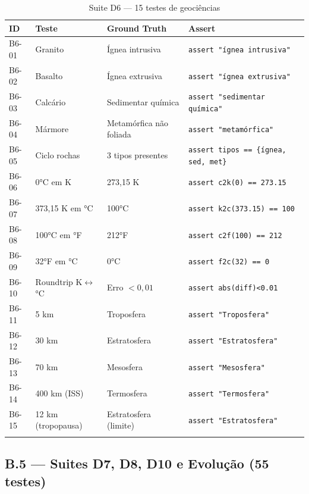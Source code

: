 \documentclass[12pt,a4paper,oneside]{article}
\begin{document}
\begin{longtable}{p{}p{}p{}p{}}
\toprule
\textbf{ID} & \textbf{Teste} & \textbf{Ground Truth} & \textbf{Assert} \\
\midrule
B6-01 & Granito & Ígnea intrusiva & \texttt{assert "ígnea intrusiva"} \\
B6-02 & Basalto & Ígnea extrusiva & \texttt{assert "ígnea extrusiva"} \\
B6-03 & Calcário & Sedimentar química & \texttt{assert "sedimentar química"} \\
B6-04 & Mármore & Metamórfica não foliada & \texttt{assert "metamórfica"} \\
B6-05 & Ciclo rochas & 3 tipos presentes & \texttt{assert tipos == \{ígnea, sed, met\}} \\
B6-06 & 0°C em K & 273,15 K & \texttt{assert c2k(0) == 273.15} \\
B6-07 & 373,15 K em °C & 100°C & \texttt{assert k2c(373.15) == 100} \\
B6-08 & 100°C em °F & 212°F & \texttt{assert c2f(100) == 212} \\
B6-09 & 32°F em °C & 0°C & \texttt{assert f2c(32) == 0} \\
B6-10 & Roundtrip K$\leftrightarrow$°C & Erro $<0{,}01$ & \texttt{assert abs(diff)<0.01} \\
B6-11 & 5 km & Troposfera & \texttt{assert "Troposfera"} \\
B6-12 & 30 km & Estratosfera & \texttt{assert "Estratosfera"} \\
B6-13 & 70 km & Mesosfera & \texttt{assert "Mesosfera"} \\
B6-14 & 400 km (ISS) & Termosfera & \texttt{assert "Termosfera"} \\
B6-15 & 12 km (tropopausa) & Estratosfera (limite) & \texttt{assert "Estratosfera"} \\
\bottomrule
\caption{Suite D6 — 15 testes de geociências}
\end{longtable}

\subsection{B.5 — Suites D7, D8, D10 e Evolução (55 testes)}
\end{document}
